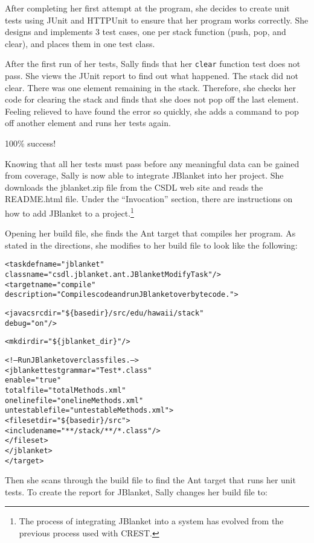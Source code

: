 After completing her first attempt at the program, she decides to create
unit tests using JUnit and HTTPUnit to ensure that her program works
correctly.  She designs and implements 3 test cases, one per stack function
(push, pop, and clear), and places them in one test class.

After the first run of her tests, Sally finds that her {\tt clear} function
test does not pass.  She views the JUnit report to find out what happened.
The stack did not clear.  There was one element remaining in the stack.
Therefore, she checks her code for clearing the stack and finds that she
does not pop off the last element.  Feeling relieved to have found the
error so quickly, she adds a command to pop off another element and runs
her tests again.

100\% success!

Knowing that all her tests must pass before any meaningful data can be
gained from coverage, Sally is now able to integrate JBlanket into her
project.  She downloads the jblanket.zip file from the CSDL web site and
reads the README.html file.  Under the ``Invocation'' section, there are
instructions on how to add JBlanket to a project.\footnote{The process of
integrating JBlanket into a system has evolved from the previous process
used with CREST.}

Opening her build file, she finds the Ant target that compiles her program.
As stated in the directions, she modifies to her build file to look like
the following:

\begin{alltt}
{\small{}<taskdef name="jblanket"
         classname="csdl.jblanket.ant.JBlanketModifyTask"/>
  <target name="compile"
    description="Compiles code and run JBlanket over byte code.">

    <javac srcdir="\$\{basedir\}/src/edu/hawaii/stack"
           debug="on"/>

    <mkdir dir="\$\{jblanket_dir\}"/>

    <!-- Run JBlanket over class files. -->
    <jblanket testgrammar="Test*.class"
              enable="true"
              totalfile="totalMethods.xml"
              onelinefile="onelineMethods.xml"
              untestablefile="untestableMethods.xml">
      <fileset dir="\$\{basedir\}/src">
        <include name="**/stack/**/*.class"/>
      </fileset>
    </jblanket>
  </target>
}
\end{alltt}
Then she scans through the build file to find the Ant target that runs her
unit tests.  To create the report for JBlanket, Sally changes her build
file to:

